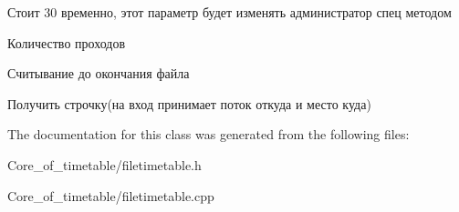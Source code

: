 Стоит 30 временно, этот параметр будет изменять администратор спец методом

Количество проходов

Считывание до окончания файла

Получить строчку(на вход принимает поток откуда и место куда) 

The documentation for this class was generated from the following files\+:\begin{DoxyCompactItemize}
\item 
Core\+\_\+of\+\_\+timetable/filetimetable.\+h\item 
Core\+\_\+of\+\_\+timetable/filetimetable.\+cpp\end{DoxyCompactItemize}
